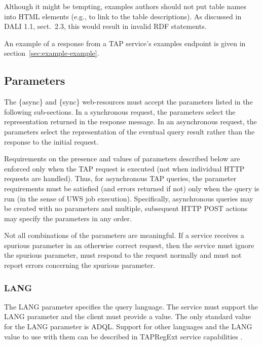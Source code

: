 \documentclass[11pt,letter]{ivoa}
\begin{document}
Although it might be tempting, examples authors should not put table
names into HTML  elements (e.g., to link to the table
descriptions).  As discussed in DALI 1.1, sect.~2.3, this would result
in invalid RDF statements.

An example of a response from a TAP service's examples endpoint is given
in section~\ref{sec:example-example}.

\subsection{Parameters}
\label{sec:parameters}

The \{async\} and \{sync\} web-resources must accept the parameters listed in 
the following sub-sections. In a synchronous request, the parameters select the 
representation returned in the response message. In an asynchronous request, the 
parameters select the representation of the eventual query result rather than 
the response to the initial request.

Requirements on the presence and values of parameters described below are 
enforced only when the TAP request is executed (not when individual HTTP 
requests are handled). Thus, for asynchronous TAP queries, the parameter 
requirements must be satisfied (and errors returned if not) only when the query 
is run (in the sense of UWS job execution). Specifically, asynchronous 
queries may be created with no parameters and multiple, subsequent HTTP 
POST actions may specify the parameters in any order.

Not all combinations of the parameters are meaningful. If a 
service receives a spurious parameter in an otherwise correct request, then the 
service must ignore the spurious parameter, must respond to the request normally 
and must not report errors concerning the spurious parameter.

\subsubsection{LANG}
\label{sec:LANG}

The LANG parameter specifies the query language. The service must support the LANG 
parameter and the client must provide a value. The only standard 
value for the LANG parameter is ADQL. Support for other 
languages and the LANG value to use with them can be described in
TAPRegExt service 
capabilities \citep{2012ivoa.spec.0827D}.
\end{document}
